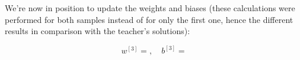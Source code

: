 \documentclass[12pt]{article}
\begin{document}
\begin{enumerate}[leftmargin=\labelsep]
  We're now in position to update the weights and biases (these calculations were performed
  for both samples instead of for only the first one, hence the different results
  in comparison with the teacher's solutions):

  \begin{equation*}
    w^{[3]} = , \quad
    b^{[3]} = 
  \end{equation*}

\end{enumerate}
\end{document}
